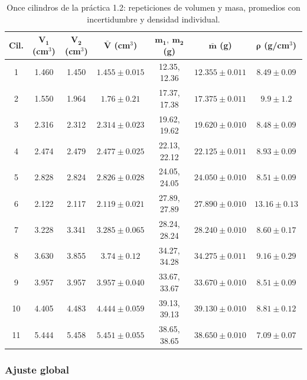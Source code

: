 \begin{table}[H]
    \centering
    \caption{Once cilindros de la práctica 1.2: repeticiones de volumen y masa, promedios con incertidumbre y densidad individual.}
    \label{tab:p12}
    \begin{tabular}{c c c c c c c}
        \toprule
        \textbf{Cil.} & $\bm{V_1}$ (cm$^{3}$) & $\bm{V_2}$ (cm$^{3}$) & $\bm{\bar V}$ (cm$^{3}$) & $\bm{m_1,\ m_2}$ (g) & $\bm{\bar m}$ (g) & $\bm{\rho}$ (g/cm$^{3}$) \\
        \midrule
        1  & 1.460 & 1.450 & $1.455 \pm 0.015$ & 12.35, 12.36 & $12.355 \pm 0.011$ & $8.49 \pm 0.09$ \\
        2  & 1.550 & 1.964 & $1.76 \pm 0.21$   & 17.37, 17.38 & $17.375 \pm 0.011$ & $9.9 \pm 1.2$ \\
        3  & 2.316 & 2.312 & $2.314 \pm 0.023$ & 19.62, 19.62 & $19.620 \pm 0.010$ & $8.48 \pm 0.09$ \\
        4  & 2.474 & 2.479 & $2.477 \pm 0.025$ & 22.13, 22.12 & $22.125 \pm 0.011$ & $8.93 \pm 0.09$ \\
        5  & 2.828 & 2.824 & $2.826 \pm 0.028$ & 24.05, 24.05 & $24.050 \pm 0.010$ & $8.51 \pm 0.09$ \\
        6  & 2.122 & 2.117 & $2.119 \pm 0.021$ & 27.89, 27.89 & $27.890 \pm 0.010$ & $13.16 \pm 0.13$ \\
        7  & 3.228 & 3.341 & $3.285 \pm 0.065$ & 28.24, 28.24 & $28.240 \pm 0.010$ & $8.60 \pm 0.17$ \\
        8  & 3.630 & 3.855 & $3.74 \pm 0.12$   & 34.27, 34.28 & $34.275 \pm 0.011$ & $9.16 \pm 0.29$ \\
        9  & 3.957 & 3.957 & $3.957 \pm 0.040$ & 33.67, 33.67 & $33.670 \pm 0.010$ & $8.51 \pm 0.09$ \\
        10 & 4.405 & 4.483 & $4.444 \pm 0.059$ & 39.13, 39.13 & $39.130 \pm 0.010$ & $8.81 \pm 0.12$ \\
        11 & 5.444 & 5.458 & $5.451 \pm 0.055$ & 38.65, 38.65 & $38.650 \pm 0.010$ & $7.09 \pm 0.07$ \\
        \bottomrule
    \end{tabular}
\end{table}

\subsubsection{Ajuste global}

